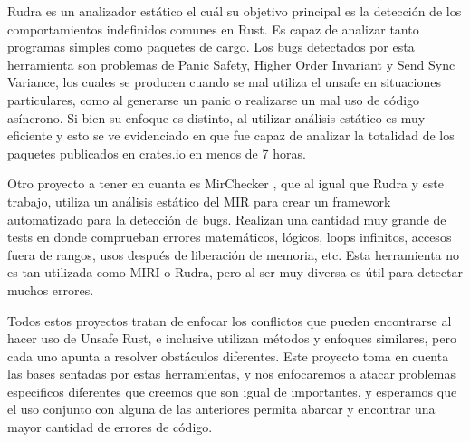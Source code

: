 Rudra \cite{rudra} es un analizador estático el cuál su objetivo principal es la detección de los comportamientos indefinidos comunes en Rust. Es capaz de analizar tanto programas simples como paquetes de cargo. Los bugs detectados por esta herramienta son problemas de Panic Safety, Higher Order Invariant y Send Sync Variance, los cuales se producen cuando se mal utiliza el unsafe en situaciones particulares, como al generarse un panic o realizarse un mal uso de código asíncrono. Si bien su enfoque es distinto, al utilizar análisis estático es muy eficiente y esto se ve evidenciado en que fue capaz de analizar la totalidad de los paquetes publicados en crates.io en menos de 7 horas.

Otro proyecto a tener en cuanta es MirChecker \cite{li2021mirchecker}, que al igual que Rudra y este trabajo, utiliza un análisis estático del MIR para crear un framework automatizado para la detección de bugs. Realizan una cantidad muy grande de tests en donde comprueban errores matemáticos, lógicos, loops infinitos, accesos fuera de rangos, usos después de liberación de memoria, etc. Esta herramienta no es tan utilizada como MIRI o Rudra, pero al ser muy diversa es útil para detectar muchos errores.

Todos estos proyectos tratan de enfocar los conflictos que pueden encontrarse al hacer uso de Unsafe Rust, e inclusive utilizan métodos y enfoques similares, pero cada uno apunta a resolver obstáculos diferentes. Este proyecto toma en cuenta las bases sentadas por estas herramientas, y nos enfocaremos a atacar problemas especificos diferentes que creemos que son igual de importantes, y esperamos que el uso conjunto con alguna de las anteriores permita abarcar y encontrar una mayor cantidad de errores de código.

